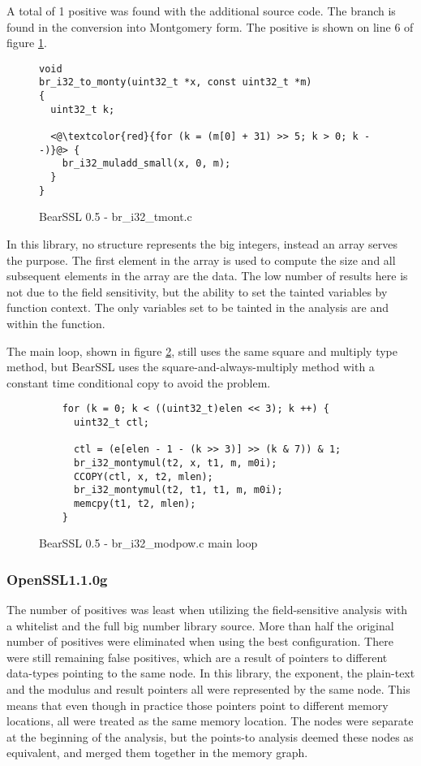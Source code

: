 A total of 1 positive was found with the additional source code. The branch is
found in the conversion into Montgomery form. The positive is shown on line 6 of
figure \ref{code:bear-tmont}.

\begin{figure}
  \begin{lstlisting}
void
br_i32_to_monty(uint32_t *x, const uint32_t *m)
{
  uint32_t k;

  <@\textcolor{red}{for (k = (m[0] + 31) >> 5; k > 0; k --)}@> {
    br_i32_muladd_small(x, 0, m);
  }
}
  \end{lstlisting}
  \caption{BearSSL 0.5 - br\_i32\_tmont.c}
  \label{code:bear-tmont}
\end{figure}

In this library, no structure represents the big integers, instead an array
serves the purpose. The first element in the array is used to compute the size
and all subsequent elements in the array are the data. The low number of results
here is not due to the field sensitivity, but the ability to set the tainted
variables by function context. The only variables set to be tainted in the
analysis are  and  within the 
function.

The main loop, shown in figure \ref{bearssl:mainloop}, still uses the same square and multiply type method, but
BearSSL uses the square-and-always-multiply method with a constant time
conditional copy to avoid the problem.

\begin{figure}[!htpb]
  \begin{lstlisting}
    for (k = 0; k < ((uint32_t)elen << 3); k ++) {
      uint32_t ctl;

      ctl = (e[elen - 1 - (k >> 3)] >> (k & 7)) & 1;
      br_i32_montymul(t2, x, t1, m, m0i);
      CCOPY(ctl, x, t2, mlen);
      br_i32_montymul(t2, t1, t1, m, m0i);
      memcpy(t1, t2, mlen);
    }
\end{lstlisting}
\caption{BearSSL 0.5 - br\_i32\_modpow.c main loop}
\label{bearssl:mainloop}
\end{figure}


\subsubsection{OpenSSL1.1.0g}

     The number of positives was least when utilizing the field-sensitive
     analysis with a whitelist and the full big number library source. More than
     half the original number of positives were eliminated when using the best
     configuration. There were still remaining false positives, which are a
     result of pointers to different data-types pointing to the same node. In
     this library, the exponent, the plain-text and the modulus and result
     pointers all were represented by the same node. This means that even though
     in practice those pointers point to different memory locations, all were
     treated as the same memory location. The nodes were separate at the
     beginning of the analysis, but the points-to analysis deemed these nodes as
     equivalent, and merged them together in the memory graph.

